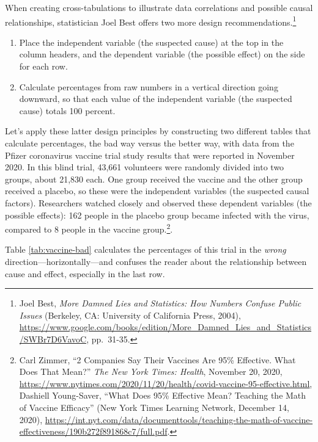 \documentclass[
  english,
]{book}
\begin{document}
When creating cross-tabulations to illustrate data correlations and possible causal relationships, statistician Joel Best offers two more design recommendations.\footnote{Joel Best, \emph{More {Damned Lies} and {Statistics}: {How Numbers Confuse Public Issues}} ({Berkeley, CA}: {University of California Press}, 2004), \url{https://www.google.com/books/edition/More_Damned_Lies_and_Statistics/SWBr7D6VavoC}, pp.~31-35.}

\begin{enumerate}
\def\labelenumi{\arabic{enumi}.}
\setcounter{enumi}{5}
\item
  Place the independent variable (the suspected cause) at the top in the column headers, and the dependent variable (the possible effect) on the side for each row.
\item
  Calculate percentages from raw numbers in a vertical direction going downward, so that each value of the independent variable (the suspected cause) totals 100 percent.
\end{enumerate}

Let's apply these latter design principles by constructing two different tables that calculate percentages, the bad way versus the better way, with data from the Pfizer coronavirus vaccine trial study results that were reported in November 2020. In this blind trial, 43,661 volunteers were randomly divided into two groups, about 21,830 each. One group received the vaccine and the other group received a placebo, so these were the independent variables (the suspected causal factors). Researchers watched closely and observed these dependent variables (the possible effects): 162 people in the placebo group became infected with the virus, compared to 8 people in the vaccine group.\footnote{Carl Zimmer, {``2 {Companies Say Their Vaccines Are} 95\% {Effective}. {What Does That Mean}?''} \emph{The New York Times: Health}, November 20, 2020, \url{https://www.nytimes.com/2020/11/20/health/covid-vaccine-95-effective.html}, Dashiell Young-Saver, {``What {Does} 95\% {Effective Mean}? {Teaching} the {Math} of {Vaccine Efficacy}''} ({New York Times Learning Network}, December 14, 2020), \url{https://int.nyt.com/data/documenttools/teaching-the-math-of-vaccine-effectiveness/190b272f891868c7/full.pdf}.}.

Table \ref{tab:vaccine-bad} calculates the percentages of this trial in the \emph{wrong} direction---horizontally---and confuses the reader about the relationship between cause and effect, especially in the last row.
\end{document}
